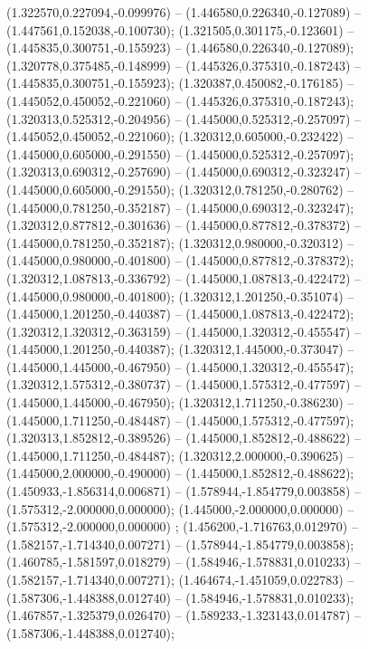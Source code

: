  (1.322570,0.227094,-0.099976) -- (1.446580,0.226340,-0.127089) -- (1.447561,0.152038,-0.100730);
 (1.321505,0.301175,-0.123601) -- (1.445835,0.300751,-0.155923) -- (1.446580,0.226340,-0.127089);
 (1.320778,0.375485,-0.148999) -- (1.445326,0.375310,-0.187243) -- (1.445835,0.300751,-0.155923);
 (1.320387,0.450082,-0.176185) -- (1.445052,0.450052,-0.221060) -- (1.445326,0.375310,-0.187243);
 (1.320313,0.525312,-0.204956) -- (1.445000,0.525312,-0.257097) -- (1.445052,0.450052,-0.221060);
 (1.320312,0.605000,-0.232422) -- (1.445000,0.605000,-0.291550) -- (1.445000,0.525312,-0.257097);
 (1.320313,0.690312,-0.257690) -- (1.445000,0.690312,-0.323247) -- (1.445000,0.605000,-0.291550);
 (1.320312,0.781250,-0.280762) -- (1.445000,0.781250,-0.352187) -- (1.445000,0.690312,-0.323247);
 (1.320312,0.877812,-0.301636) -- (1.445000,0.877812,-0.378372) -- (1.445000,0.781250,-0.352187);
 (1.320312,0.980000,-0.320312) -- (1.445000,0.980000,-0.401800) -- (1.445000,0.877812,-0.378372);
 (1.320312,1.087813,-0.336792) -- (1.445000,1.087813,-0.422472) -- (1.445000,0.980000,-0.401800);
 (1.320312,1.201250,-0.351074) -- (1.445000,1.201250,-0.440387) -- (1.445000,1.087813,-0.422472);
 (1.320312,1.320312,-0.363159) -- (1.445000,1.320312,-0.455547) -- (1.445000,1.201250,-0.440387);
 (1.320312,1.445000,-0.373047) -- (1.445000,1.445000,-0.467950) -- (1.445000,1.320312,-0.455547);
 (1.320312,1.575312,-0.380737) -- (1.445000,1.575312,-0.477597) -- (1.445000,1.445000,-0.467950);
 (1.320312,1.711250,-0.386230) -- (1.445000,1.711250,-0.484487) -- (1.445000,1.575312,-0.477597);
 (1.320313,1.852812,-0.389526) -- (1.445000,1.852812,-0.488622) -- (1.445000,1.711250,-0.484487);
 (1.320312,2.000000,-0.390625) -- (1.445000,2.000000,-0.490000) -- (1.445000,1.852812,-0.488622);
 (1.450933,-1.856314,0.006871) -- (1.578944,-1.854779,0.003858) -- (1.575312,-2.000000,0.000000);
 (1.445000,-2.000000,0.000000) -- (1.575312,-2.000000,0.000000) ;
 (1.456200,-1.716763,0.012970) -- (1.582157,-1.714340,0.007271) -- (1.578944,-1.854779,0.003858);
 (1.460785,-1.581597,0.018279) -- (1.584946,-1.578831,0.010233) -- (1.582157,-1.714340,0.007271);
 (1.464674,-1.451059,0.022783) -- (1.587306,-1.448388,0.012740) -- (1.584946,-1.578831,0.010233);
 (1.467857,-1.325379,0.026470) -- (1.589233,-1.323143,0.014787) -- (1.587306,-1.448388,0.012740);
